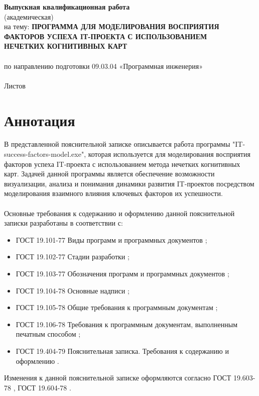\documentclass{article}
\begin{document}
    \clearpage
    \bigskip
    \bigskip
    \begin{center}
        \topskip=0pt
        \vspace*{\fill}
        \textbf{Выпускная квалификационная работа}\\
        (академическая)\\
        на тему: \textbf{ПРОГРАММА ДЛЯ МОДЕЛИРОВАНИЯ ВОСПРИЯТИЯ\\
        ФАКТОРОВ УСПЕХА IТ-ПРОЕКТА С ИСПОЛЬЗОВАНИЕМ\\
        НЕЧЕТКИХ КОГНИТИВНЫХ КАРТ}\\
        ~\\
        по направлению подготовки 09.03.04 «Программная инженерия»\\
        ~\\
        Листов \ztotpages\\
        \vspace*{\fill}
    \end{center}
    \begin{center}
    \end{center}
    \newpage
    \tableofcontents
    \newpage
    \section {Аннотация}
    В представленной пояснительной записке описывается работа программы "{}IT-success-factors-model.exe"{}, которая используется для моделирования восприятия факторов успеха IT-проекта с использованием метода нечетких когнитивных карт. Задачей данной программы является обеспечение возможности визуализации, анализа и понимания динамики развития IT-проектов посредством моделирования взаимного влияния ключевых факторов их успешности.\\
    ~\\
    Основные требования к содержанию и оформлению данной пояснительной записки разработаны в соответствии с:
    \begin{itemize}
        \item ГОСТ 19.101-77 Виды программ и программных документов \cite{litlink1};
        \item ГОСТ 19.102-77 Стадии разработки \cite{litlink2};
        \item ГОСТ 19.103-77 Обозначения программ и программных документов \cite{litlink3};
        \item ГОСТ 19.104-78 Основные надписи \cite{litlink4};
        \item ГОСТ 19.105-78 Общие требования к программным документам \cite{litlink5};
        \item ГОСТ 19.106-78 Требования к программным документам, выполненным печатным
        способом \cite{litlink6};
        \item ГОСТ 19.404-79 Пояснительная записка. Требования к содержанию и оформлению \cite{litlink7}.
    \end{itemize}
    Изменения к данной пояснительной записке оформляются согласно ГОСТ 19.603-78 \cite{litlink8}, ГОСТ 19.604-78 \cite{litlink9}.
    \newpage
\end{document}
